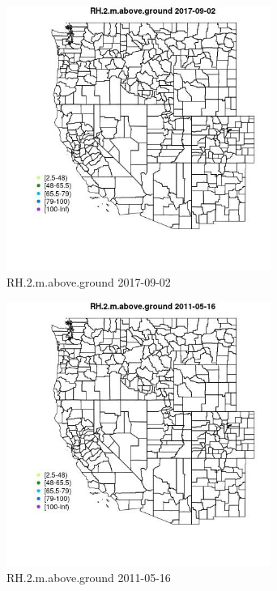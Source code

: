 \begin{figure} 
\centering  
\includegraphics[width=0.77\textwidth]{Code_Outputs/Report_ML_input_PM25_Step4_part_e_de_duplicated_aveswNAs_MapObsRH2maboveground2017-09-02.jpg} 
\caption{\label{fig:Report_ML_input_PM25_Step4_part_e_de_duplicated_aveswNAsMapObsRH2maboveground2017-09-02}RH.2.m.above.ground 2017-09-02} 
\end{figure} 
 

\begin{figure} 
\centering  
\includegraphics[width=0.77\textwidth]{Code_Outputs/Report_ML_input_PM25_Step4_part_e_de_duplicated_aveswNAs_MapObsRH2maboveground2011-05-16.jpg} 
\caption{\label{fig:Report_ML_input_PM25_Step4_part_e_de_duplicated_aveswNAsMapObsRH2maboveground2011-05-16}RH.2.m.above.ground 2011-05-16} 
\end{figure} 
 


